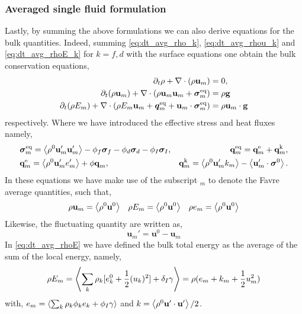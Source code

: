 \subsubsection{Averaged single fluid formulation}
Lastly, by summing the above formulations we can also derive equations for the bulk quantities. 
Indeed, summing \ref{eq:dt_avg_rho_k}, \ref{eq:dt_avg_rhou_k} and \ref{eq:dt_avg_rhoE_k} for $k=f,d$ with the surface equations one obtain the bulk conservation equations, 
\begin{align}
    \label{eq:dt_avg_rho}
    \partial_t \rho 
    + \mathbf{\nabla}\cdot (
         \rho \textbf{u}_m
    )
    &= 
    0,\\
    \label{eq:dt_avg_rhou}
    \partial_t ( \rho\textbf{u}_m)  
    + \mathbf{\nabla}\cdot (
         \rho\textbf{u}_m\textbf{u}_m
        + \bm{\sigma}^\text{eq}_m
    )
    &= 
     \rho \textbf{g} \\
    \label{eq:dt_avg_rhoE}
    \partial_t (\rho E_m)  
    + \mathbf{\nabla}\cdot (
        \rho E_m \textbf{u}_m
        + \bm{q}^\text{eq}_m
        + \textbf{u}_m \cdot \bm{\sigma}^\text{eq}_m
        )
    &= 
     \rho \textbf{u}_m  \cdot \textbf{g} 
\end{align} 
respectively. 
Where we have introduced the effective stress and heat fluxes namely, 
\begin{align*}
    &\bm{\sigma}^\text{eq}_m
    = 
    \avg{ \rho^0\textbf{u}'_m\textbf{u}'_m}
      - \phi_f\bm\sigma_f
      - \phi_d\bm\sigma_d
      - \phi_I\bm\sigma_I,%
    &\textbf{q}^\text{eq}_m
    =\textbf{q}^\text{e}_m +\textbf{q}^\text{k}_m,  \\
    &\textbf{q}^\text{e}_m
    = \avg{\rho^0\textbf{u}_m' e_m'} 
    + \phi\textbf{q}_m,
    &\textbf{q}^\text{k}_m
    = \avg{\rho^0 \textbf{u}_m' k_m} 
    - \avg{ \textbf{u}_m' \cdot \bm{\sigma}^0}.
\end{align*}
In these equations we have make use of the subscript $_m$ to denote the Favre average quantities, such that, 
\begin{align*}
    \rho \textbf{u}_m
    = \left<\rho^0 \textbf{u}^0\right>
    &&
    \rho E_m
    = \left<\rho^0 \textbf{u}^0\right>
    &&
    \rho e_m
    = \left<\rho^0 \textbf{u}^0\right>
\end{align*}
Likewise, the fluctuating quantity are written as, 
\begin{equation}
    \textbf{u}_m'
    = \textbf{u}^0 - \textbf{u}_m
\end{equation}
In \ref{eq:dt_avg_rhoE} we have defined the bulk total energy as the average of the sum of the local energy, namely, 
\begin{equation}
    \rho E_m = \left<\sum_k \rho_k [e_k^0 + \frac{1}{2}(u_k)^2] 
    + \delta_I \gamma\right>
    = \rho( e_m +  k_m + \frac{1}{2}u_m^2)
\end{equation}
with, $e_m = \left<\sum_k \rho_k\phi_k e_k + \phi_I \gamma\right>$ and $k = \left<\rho^0 \textbf{u}'\cdot \textbf{u}'\right>/2$. 


